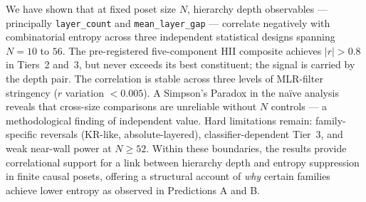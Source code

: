 \documentclass[entropy,article,submit,pdftex,moreauthors]{Definitions/mdpi}
\begin{document}
We have shown that at fixed poset size $N$, hierarchy depth observables --- principally \texttt{layer\_count} and \texttt{mean\_layer\_gap} --- correlate negatively with combinatorial entropy across three independent statistical designs spanning $N = 10$ to $56$. The pre-registered five-component HII composite achieves $|r| > 0.8$ in Tiers~2 and~3, but never exceeds its best constituent; the signal is carried by the depth pair. The correlation is stable across three levels of MLR-filter stringency ($r$ variation $< 0.005$). A Simpson's Paradox in the na\"ive analysis reveals that cross-size comparisons are unreliable without $N$ controls --- a methodological finding of independent value. Hard limitations remain: family-specific reversals (KR-like, absolute-layered), classifier-dependent Tier~3, and weak near-wall power at $N \geq 52$. Within these boundaries, the results provide correlational support for a link between hierarchy depth and entropy suppression in finite causal posets, offering a structural account of \emph{why} certain families achieve lower entropy as observed in Predictions A and B.

\vspace{6pt}





\end{document}
